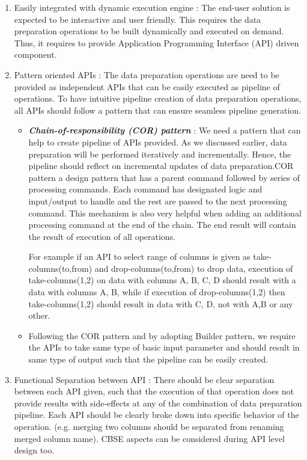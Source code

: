 \begin{enumerate}
\item Easily integrated with dynamic execution engine : The end-user solution is expected to be interactive and user friendly. This requires the data preparation operations to be built dynamically and executed on demand. Thus, it requires to provide Application Programming Interface (API) driven component.
\item Pattern oriented APIs : The data preparation operations are need to be provided as independent APIs that can be easily executed as pipeline of operations. To have intuitive pipeline creation of data preparation operations, all APIs should follow a pattern that can ensure seamless pipeline generation.
\begin{itemize}
\item \textit{\textbf{Chain-of-responsibility (COR) pattern}} : We need a pattern that can help to create pipeline of APIs provided. As we discussed earlier, data preparation will be performed iteratively and incrementally. Hence, the pipeline should reflect on incremental updates of data preparation.COR pattern a design pattern that has a parent command followed by series of processing commands. Each command has designated logic and input/output to handle and the rest are passed to the next processing command. This mechanism is also very helpful when adding an additional processing command at the end of the chain. The end result will contain the result of execution of all operations. 

For example if an API to select range of columns is given as take-columns(to,from) and drop-columns(to,from) to drop data, execution of take-columns(1,2) on data with columns A, B, C, D should result with a data with columns A, B, while if execution of drop-columns(1,2) then take-columns(1,2) should result in data with C, D, not with A,B or any other. 
\item Following the COR pattern and by adopting Builder pattern, we require the APIs to take same type of basic input parameter and should result in same type of output such that the pipeline can be easily created. 
\end{itemize}
\item Functional Separation between API : There should be clear separation between each API given, such that the execution of that operation does not provide results with side-effects at any of the combination of data preparation pipeline. Each API should be clearly broke down into specific behavior of the operation. (e.g. merging two columns should be separated from renaming merged column name). CBSE aspects can be considered during API level design too.
\end{enumerate}
